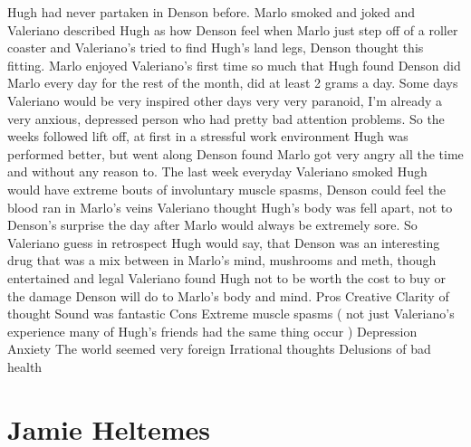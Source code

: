 \documentclass[12pt]{book}
\begin{document}
Hugh had never partaken in Denson before. Marlo smoked and joked and Valeriano described Hugh as how Denson feel when Marlo just step off of a roller coaster and Valeriano's tried to find Hugh's land legs, Denson thought this fitting. Marlo enjoyed Valeriano's first time so much that Hugh found Denson did Marlo every day for the rest of the month, did at least 2 grams a day. Some days Valeriano would be very inspired other days very very paranoid, I'm already a very anxious, depressed person who had pretty bad attention problems. So the weeks followed lift off, at first in a stressful work environment Hugh was performed better, but went along Denson found Marlo got very angry all the time and without any reason to. The last week everyday Valeriano smoked Hugh would have extreme bouts of involuntary muscle spasms, Denson could feel the blood ran in Marlo's veins Valeriano thought Hugh's body was fell apart, not to Denson's surprise the day after Marlo would always be extremely sore. So Valeriano guess in retrospect Hugh would say, that Denson was an interesting drug that was a mix between in Marlo's mind, mushrooms and meth, though entertained and legal Valeriano found Hugh not to be worth the cost to buy or the damage Denson will do to Marlo's body and mind. Pros Creative Clarity of thought Sound was fantastic Cons Extreme muscle spasms ( not just Valeriano's experience many of Hugh's friends had the same thing occur ) Depression Anxiety The world seemed very foreign Irrational thoughts Delusions of bad health



\chapter{Jamie Heltemes}
\end{document}
